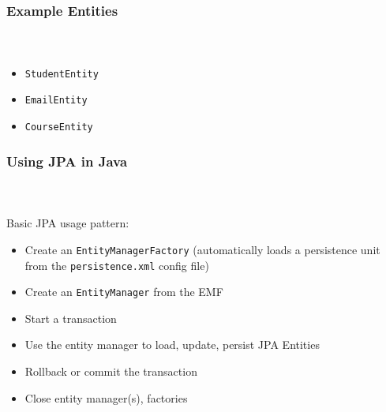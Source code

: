\documentclass{beamer}
\begin{document}
\begin{frame}[fragile]
  \frametitle{Example Entities}
  \framesubtitle{~}

\begin{itemize}
  \item \lstinline|StudentEntity|
  \item \lstinline|EmailEntity|
  \item \lstinline|CourseEntity|
\end{itemize}

\end{frame}

\begin{frame}[fragile]
  \frametitle{Using JPA in Java}
  \framesubtitle{~}

Basic JPA usage pattern:
\begin{itemize}
  \item Create an \lstinline|EntityManagerFactory| (automatically loads a persistence unit from the \lstinline|persistence.xml| config file)
  \item Create an \lstinline|EntityManager| from the EMF
  \item Start a transaction
  \item Use the entity manager to load, update, persist JPA Entities
  \item Rollback or commit the transaction
  \item Close entity manager(s), factories
\end{itemize}

\end{frame}
\end{document}
